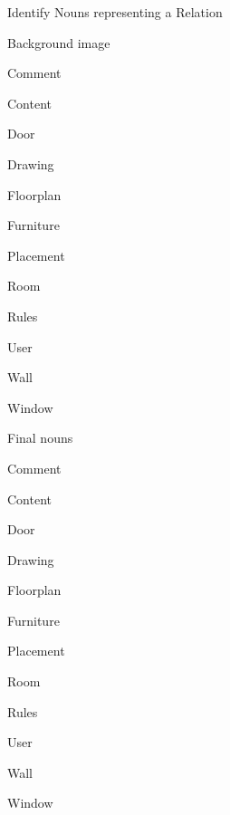 \begin{paracol}{4}
			
			\switchcolumn
			Identify Nouns representing a Relation\\
			\begin{compactitem}
				\item Background image
				\item Comment
				\item Content
				\item Door
				\item Drawing
				\item Floorplan
				\item Furniture
				\item Placement
				\item Room
				\item Rules
				\item User
				\item Wall
				\item Window
			\end{compactitem}
			
			
			\switchcolumn
			Final nouns\\
			\begin{compactitem}
				\item Comment
				\item Content
				\item Door
				\item Drawing
				\item Floorplan
				\item Furniture
				\item Placement
				\item Room
				\item Rules
				\item User
				\item Wall
				\item Window
			\end{compactitem}
			
			\bigskip
			
		\end{paracol}
	
\clearpage